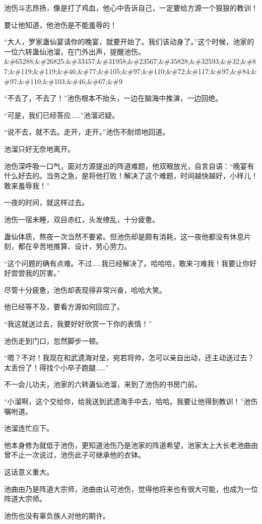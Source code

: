 \begin{this_body}
池伤斗志昂扬，像是打了鸡血，他心中告诉自己，一定要给方源一个狠狠的教训！

要让他知道，他池伤是不能羞辱的！

“大人，罗家蛊仙宴请你的晚宴，就要开始了。我们该动身了。”这个时候，池家的一位六转蛊仙池溜，在门外出声，提醒池伤。\&\#65288;\&\#26825;\&\#33457;\&\#31958;\&\#23567;\&\#35828;\&\#32593;\&\#32;\&\#87;\&\#119;\&\#119;\&\#46;\&\#77;\&\#105;\&\#97;\&\#110;\&\#72;\&\#117;\&\#97;\&\#84;\&\#97;\&\#110;\&\#103;\&\#46;\&\#67;\&\#9

“不去了，不去了！”池伤根本不抬头，一边在脑海中推演，一边回绝。

“可是，我们已经答应……”池溜迟疑。

“说不去，就不去。走开，走开。”池伤不耐烦地回道。

池溜只好无奈地离开。

池伤深呼吸一口气，面对方源提出的阵道难题，他双眼放光，自言自语：“晚宴有什么好去的。当务之急，是将他打败！解决了这个难题，时间越快越好，小样儿！敢来羞辱我！”

一夜的时间，就这样过去。

池伤一宿未睡，双目赤红，头发缭乱，十分疲惫。

蛊仙体质，熬夜一次当然不要紧。但池伤却是颇有消耗，这一夜他都没有休息片刻，都在辛苦地推算、设计，劳心劳力。

“这个问题的确有点难。不过……我已经解决了。哈哈哈，敢来刁难我！我要让你好好尝尝我的厉害。”

尽管十分疲惫，池伤却表现得非常兴奋，哈哈大笑。

他已经等不及，要看方源如何回应了。

“我这就送过去，我要好好欣赏一下你的表情！”

池伤走到门口，忽然脚步一顿。

“嗯？不对！我现在和武遗海对垒，宛若将帅，怎可以亲自出动，还主动送过去？太丢份了！得找个小卒子跑腿……”

不一会儿功夫，池家的六转蛊仙池溜，来到了池伤的书房门前。

“小溜啊，这个交给你，给我送到武遗海手中去，哈哈。我要让他得到教训！”池伤嘱咐道。

池溜连忙应下。

他本身修为就低于池伤，更知道池伤乃是池家的阵道希望，池家太上大长老池曲由曾不止一次说过，池伤此子可继承他的衣钵。

这话意义重大。

池曲由乃是阵道大宗师，池曲由认可池伤，觉得他将来也有很大可能，也成为一位阵道大宗师。

池伤也没有辜负族人对他的期许。


\end{this_body}
